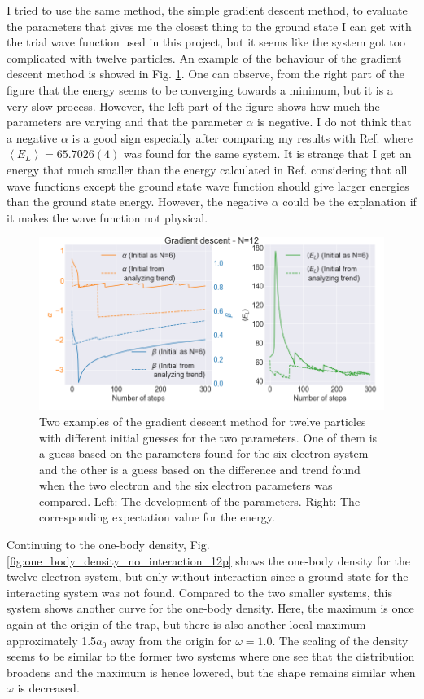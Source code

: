 I tried to use the same method, the simple gradient descent method, to evaluate the parameters that gives me the closest thing to the ground state I can get with the trial wave function used in this project, but it seems like the system got too complicated with twelve particles. An example of the behaviour of the gradient descent method is showed in Fig. \ref{fig:gradient_descent_12p}. One can observe, from the right part of the figure that the energy seems to be converging towards a minimum, but it is a very slow process. However, the left part of the figure shows how much the parameters are varying and that the parameter $\alpha$ is negative. I do not think that a negative $\alpha$ is a good sign especially after comparing my results with Ref. \cite{Evens_master} where $\left< E_L \right> = 65.7026(4)$ was found for the same system. It is strange that I get an energy that much smaller than the energy calculated in Ref. \cite{Evens_master} considering that all wave functions except the ground state wave function should give larger energies than the ground state energy. However, the negative $\alpha$ could be the explanation if it makes the wave function not physical.

\begin{figure}[H]
\center
\includegraphics[width=0.85\linewidth]{../Results/gradient_descent_12p}\caption{Two examples of the gradient descent method for twelve particles with different initial guesses for the two parameters. One of them is a guess based on the parameters found for the six electron system and the other is a guess based on the difference and trend found when the two electron and the six electron parameters was compared. Left: The development of the parameters. Right: The corresponding expectation value for the energy. }\label{fig:gradient_descent_12p}
\end{figure}

Continuing to the one-body density, Fig. \ref{fig:one_body_density_no_interaction_12p} shows the one-body density for the twelve electron system, but only without interaction since a ground state for the interacting system was not found. Compared to the two smaller systems, this system shows another curve for the one-body density. Here, the maximum is once again at the origin of the trap, but there is also another local maximum approximately 1.5$a_0$ away from the origin for $\omega = 1.0$. The scaling of the density seems to be similar to the former two systems where one see that the distribution broadens and the maximum is hence lowered, but the shape remains similar when $\omega$ is decreased.

